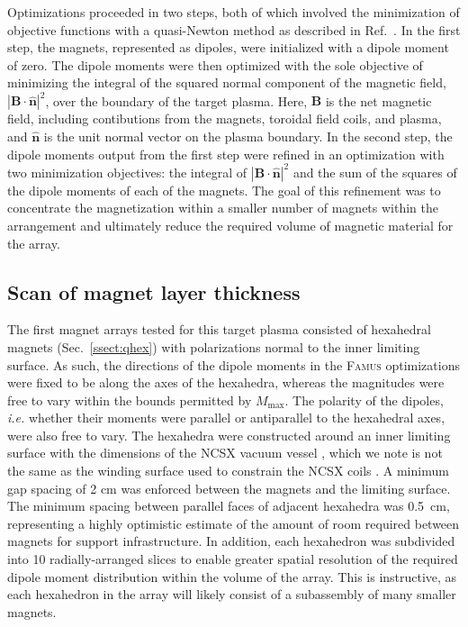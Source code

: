 \documentclass[11pt,onecolumn]{article}
\newcommand{\bnormsq}{|\mathbf{B}\cdot\hat{\mathbf{n}}|^2}
\begin{document}
Optimizations proceeded in two steps, both of which involved the minimization
of objective functions with a quasi-Newton method as described in 
Ref.~\cite{zhu2020b}. In the 
first step, the magnets, represented as dipoles, were initialized with a 
dipole moment of zero. The dipole moments were then optimized with the sole
objective of minimizing the integral of the squared normal component of the 
magnetic field, $\bnormsq$, over the boundary of the
target plasma. Here, $\mathbf{B}$ is the net magnetic field, including 
contibutions from the magnets, toroidal field coils, and plasma, and 
$\hat{\mathbf{n}}$ is the unit normal vector on the plasma boundary.
In the second step, the dipole moments
output from the first step were refined in an optimization with two 
minimization objectives: the integral of $\bnormsq$ and the sum of the squares 
of the dipole 
moments of each of the magnets. The goal of this refinement
was to concentrate the magnetization within a smaller number of magnets within
the arrangement and ultimately reduce the required volume of
magnetic material for the array. 

\subsection{Scan of magnet layer thickness}
\label{ssect:qhex_r_scan_normal}

The first magnet arrays tested for this target plasma consisted of 
hexahedral magnets (Sec.~\ref{ssect:qhex}) with polarizations normal to the 
inner limiting surface. As such, the directions of the dipole moments in the
\textsc{Famus} optimizations were fixed to be along the axes of the hexahedra, 
whereas the magnitudes were free to vary within the bounds permitted 
by $M_\text{max}$. The polarity of the dipoles, \textit{i.e.} whether their
moments were parallel or antiparallel to the hexahedral axes, were also free to 
vary. The hexahedra were constructed around an inner limiting surface with the 
dimensions of the NCSX vacuum vessel \cite{nelson2003a,dahlgren2005a}, which 
we note is not the same as the winding surface used to constrain the NCSX 
coils \cite{pomphrey2001a}. 
A minimum gap spacing of 2 cm was enforced between 
the magnets and the limiting surface.
The minimum spacing between parallel faces of adjacent hexahedra was 0.5~cm,
representing a highly optimistic estimate of the amount of room required between
magnets for support infrastructure.
In addition, each hexahedron was subdivided into 10 radially-arranged slices
to enable greater spatial resolution of the required dipole moment distribution
within the volume of the array.
This is instructive, as each hexahedron in the array will likely consist of a 
subassembly of many smaller magnets.
\end{document}
